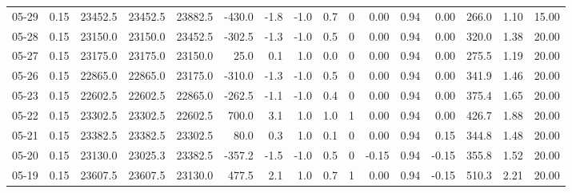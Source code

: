 \begin{threeparttable}
{\begin{tabular}{lrrrrrrrrrrrrrrr}
  05-29 &     0.15 & 23452.5 & 23452.5 & 23882.5 &     -430.0 &           -1.8 &                     -1.0 &                 0.7 &              0 &       0.00 &      0.94 &           0.00 &            266.0 &            1.10 &                  15.00 \\
  05-28 &     0.15 & 23150.0 & 23150.0 & 23452.5 &     -302.5 &           -1.3 &                     -1.0 &                 0.5 &              0 &       0.00 &      0.94 &           0.00 &            320.0 &            1.38 &                  20.00 \\
  05-27 &     0.15 & 23175.0 & 23175.0 & 23150.0 &       25.0 &            0.1 &                      1.0 &                 0.0 &              0 &       0.00 &      0.94 &           0.00 &            275.5 &            1.19 &                  20.00 \\
  05-26 &     0.15 & 22865.0 & 22865.0 & 23175.0 &     -310.0 &           -1.3 &                     -1.0 &                 0.5 &              0 &       0.00 &      0.94 &           0.00 &            341.9 &            1.46 &                  20.00 \\
  05-23 &     0.15 & 22602.5 & 22602.5 & 22865.0 &     -262.5 &           -1.1 &                     -1.0 &                 0.4 &              0 &       0.00 &      0.94 &           0.00 &            375.4 &            1.65 &                  20.00 \\
  05-22 &     0.15 & 23302.5 & 23302.5 & 22602.5 &      700.0 &            3.1 &                      1.0 &                 1.0 &              1 &       0.00 &      0.94 &           0.00 &            426.7 &            1.88 &                  20.00 \\
  05-21 &     0.15 & 23382.5 & 23382.5 & 23302.5 &       80.0 &            0.3 &                      1.0 &                 0.1 &              0 &       0.00 &      0.94 &           0.15 &            344.8 &            1.48 &                  20.00 \\
  05-20 &     0.15 & 23130.0 & 23025.3 & 23382.5 &     -357.2 &           -1.5 &                     -1.0 &                 0.5 &              0 &      -0.15 &      0.94 &          -0.15 &            355.8 &            1.52 &                  20.00 \\
  05-19 &     0.15 & 23607.5 & 23607.5 & 23130.0 &      477.5 &            2.1 &                      1.0 &                 0.7 &              1 &       0.00 &      0.94 &          -0.15 &            510.3 &            2.21 &                  20.00 \\

\end{tabular}}
\end{threeparttable}
